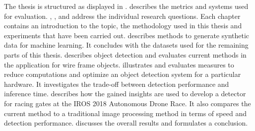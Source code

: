 The thesis is structured as displayed in .  describes the metrics and systems used for evaluation. , ,  and  address the individual research questions. Each chapter contains an introduction to the topic, the methodology used in this thesis and experiments that have been carried out.  describes methods to generate synthetic data for machine learning. It concludes with the datasets used for the remaining parts of this thesis.   describes object detection and evaluates current methods in the application for wire frame objects.  illustrates and evaluates measures to reduce computations and optimize an object detection system for a particular hardware. It investigates the trade-off between detection performance and inference time.  describes how the gained insights are used to develop a detector for racing gates at the \ac{IROS} 2018 Autonomous Drone Race. It also compares the current method to a traditional image processing method in terms of speed and detection performance.  discusses the overall results and formulates a conclusion.



